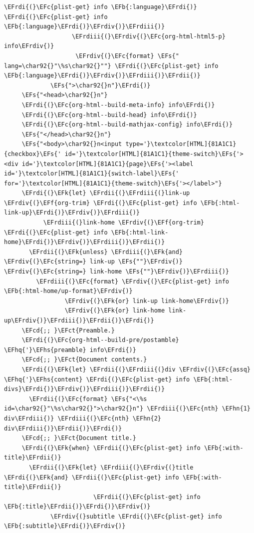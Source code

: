 \documentclass{scrartcl}
\newcommand{\EFk}[1]{\textcolor{EFk}{#1}} %
\newcommand{\EFs}[1]{\textcolor{EFs}{#1}} %
\newcommand{\EFb}[1]{\textcolor{EFb}{#1}} %
\newcommand{\EFct}[1]{\textcolor{EFct}{#1}} %
\newcommand{\EFc}[1]{\textcolor{EFc}{#1}} %
\newcommand{\EFf}[1]{\textcolor{EFf}{#1}} %
\newcommand{\EFcd}[1]{\textcolor{EFcd}{#1}} %
\newcommand{\EFhn}[1]{#1} %
\newcommand{\EFhq}[1]{#1} %
\newcommand{\EFhs}[1]{#1} %
\newcommand{\EFrdi}[1]{#1} %
\newcommand{\EFrdii}[1]{#1} %
\newcommand{\EFrdiii}[1]{#1} %
\newcommand{\EFrdiv}[1]{#1} %
\begin{document}
\begin{Code}
\begin{Verbatim}[]
                     \EFrdi{(}\EFc{plist-get} info \EFb{:language}\EFrdi{)} \EFrdi{(}\EFc{plist-get} info \EFb{:language}\EFrdi{)}\EFrdiv{)}\EFrdiii{)}
                   \EFrdiii{(}\EFrdiv{(}\EFc{org-html-html5-p} info\EFrdiv{)}
                    \EFrdiv{(}\EFc{format} \EFs{" lang=\char92{}"\%s\char92{}""} \EFrdi{(}\EFc{plist-get} info \EFb{:language}\EFrdi{)}\EFrdiv{)}\EFrdiii{)}\EFrdii{)}
             \EFs{">\char92{}n"}\EFrdi{)}
     \EFs{"<head>\char92{}n"}
     \EFrdi{(}\EFc{org-html--build-meta-info} info\EFrdi{)}
     \EFrdi{(}\EFc{org-html--build-head} info\EFrdi{)}
     \EFrdi{(}\EFc{org-html--build-mathjax-config} info\EFrdi{)}
     \EFs{"</head>\char92{}n"}
     \EFs{"<body>\char92{}n<input type='}\textcolor[HTML]{81A1C1}{checkbox}\EFs{' id='}\textcolor[HTML]{81A1C1}{theme-switch}\EFs{'><div id='}\textcolor[HTML]{81A1C1}{page}\EFs{'><label id='}\textcolor[HTML]{81A1C1}{switch-label}\EFs{' for='}\textcolor[HTML]{81A1C1}{theme-switch}\EFs{'></label>"}
     \EFrdi{(}\EFk{let} \EFrdii{(}\EFrdiii{(}link-up \EFrdiv{(}\EFf{org-trim} \EFrdi{(}\EFc{plist-get} info \EFb{:html-link-up}\EFrdi{)}\EFrdiv{)}\EFrdiii{)}
           \EFrdiii{(}link-home \EFrdiv{(}\EFf{org-trim} \EFrdi{(}\EFc{plist-get} info \EFb{:html-link-home}\EFrdi{)}\EFrdiv{)}\EFrdiii{)}\EFrdii{)}
       \EFrdii{(}\EFk{unless} \EFrdiii{(}\EFk{and} \EFrdiv{(}\EFc{string=} link-up \EFs{""}\EFrdiv{)} \EFrdiv{(}\EFc{string=} link-home \EFs{""}\EFrdiv{)}\EFrdiii{)}
         \EFrdiii{(}\EFc{format} \EFrdiv{(}\EFc{plist-get} info \EFb{:html-home/up-format}\EFrdiv{)}
                 \EFrdiv{(}\EFk{or} link-up link-home\EFrdiv{)}
                 \EFrdiv{(}\EFk{or} link-home link-up\EFrdiv{)}\EFrdiii{)}\EFrdii{)}\EFrdi{)}
     \EFcd{;; }\EFct{Preamble.}
     \EFrdi{(}\EFc{org-html--build-pre/postamble} \EFhq{'}\EFhs{preamble} info\EFrdi{)}
     \EFcd{;; }\EFct{Document contents.}
     \EFrdi{(}\EFk{let} \EFrdii{(}\EFrdiii{(}div \EFrdiv{(}\EFc{assq} \EFhq{'}\EFhs{content} \EFrdi{(}\EFc{plist-get} info \EFb{:html-divs}\EFrdi{)}\EFrdiv{)}\EFrdiii{)}\EFrdii{)}
       \EFrdii{(}\EFc{format} \EFs{"<\%s id=\char92{}"\%s\char92{}">\char92{}n"} \EFrdiii{(}\EFc{nth} \EFhn{1} div\EFrdiii{)} \EFrdiii{(}\EFc{nth} \EFhn{2} div\EFrdiii{)}\EFrdii{)}\EFrdi{)}
     \EFcd{;; }\EFct{Document title.}
     \EFrdi{(}\EFk{when} \EFrdii{(}\EFc{plist-get} info \EFb{:with-title}\EFrdii{)}
       \EFrdii{(}\EFk{let} \EFrdiii{(}\EFrdiv{(}title \EFrdi{(}\EFk{and} \EFrdii{(}\EFc{plist-get} info \EFb{:with-title}\EFrdii{)}
                         \EFrdii{(}\EFc{plist-get} info \EFb{:title}\EFrdii{)}\EFrdi{)}\EFrdiv{)}
             \EFrdiv{(}subtitle \EFrdi{(}\EFc{plist-get} info \EFb{:subtitle}\EFrdi{)}\EFrdiv{)}

\end{Verbatim}
\end{Code}
\end{document}
